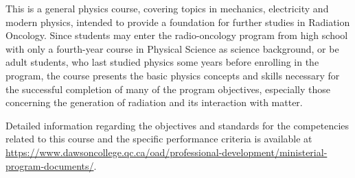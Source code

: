 {This is a general physics course, covering topics in mechanics, electricity and modern physics, intended to provide a foundation for further studies in Radiation Oncology.
Since students may enter the radio-oncology program from high school with only a fourth-year course in Physical Science as science background, or be adult students, who last studied physics some years before enrolling in the program, the course presents the basic physics concepts and skills necessary for the successful completion of many of the program objectives, especially those concerning the generation of radiation and its interaction with matter.
\smallskip

Detailed information regarding the objectives and standards for the competencies related to this course and the specific performance criteria is available at \url{https://www.dawsoncollege.qc.ca/oad/professional-development/ministerial-program-documents/}.}
